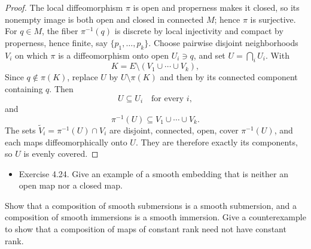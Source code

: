 \begin{proof}

\sketch
The local diffeomorphism $\pi$ is open and properness makes it closed, so its nonempty image is both open and closed in connected $M$; hence $\pi$ is surjective. For $q\in M$, the fiber $\pi^{-1}(q)$ is discrete by local injectivity and compact by properness, hence finite, say $\{p_1,\ldots,p_k\}$. Choose pairwise disjoint neighborhoods $V_i$ on which $\pi$ is a diffeomorphism onto open $U_i\ni q$, and set $U=\bigcap_iU_i$. With
\[
K=E\setminus(V_1\cup\cdots\cup V_k),
\]
Since $q\notin\pi(K)$, replace $U$ by $U\setminus\pi(K)$ and then by its connected component containing $q$. Then
\begin{equation}
U\subseteq U_i\quad\text{for every }i, \tag{4.8}
\end{equation}
and
\begin{equation}
\pi^{-1}(U)\subseteq V_1\cup\cdots\cup V_k. \tag{4.9}
\end{equation}
The sets $\widetilde V_i=\pi^{-1}(U)\cap V_i$ are disjoint, connected, open, cover $\pi^{-1}(U)$, and each maps diffeomorphically onto $U$. They are therefore exactly its components, so $U$ is evenly covered.
\end{proof}

\begin{exercise}
\label{exer:4-24}


\begin{itemize}
\item Exercise 4.24. Give an example of a smooth embedding that is neither an open map nor a closed map.
\end{itemize}
\end{exercise}

\begin{exercise}
\label{exer:4-4}


Show that a composition of smooth submersions is a smooth submersion, and a composition of smooth immersions is a smooth immersion. Give a counterexample to show that a composition of maps of constant rank need not have constant rank.
\end{exercise}
